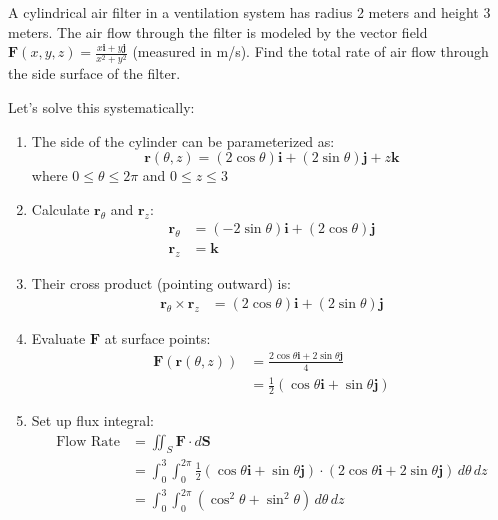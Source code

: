\exampleline
\begin{example}
A cylindrical air filter in a ventilation system has radius 2 meters and height 3 meters. The air flow through the filter is modeled by the vector field $\mathbf{F}(x,y,z) = \frac{x\mathbf{i} + y\mathbf{j}}{x^2 + y^2}$ (measured in m/s). Find the total rate of air flow through the side surface of the filter.

\begin{solution}
Let's solve this systematically:

\begin{enumerate}
    \item The side of the cylinder can be parameterized as:
    \[
    \mathbf{r}(\theta,z) = (2\cos\theta)\mathbf{i} + (2\sin\theta)\mathbf{j} + z\mathbf{k}
    \]
    where $0 \leq \theta \leq 2\pi$ and $0 \leq z \leq 3$
    
    \item Calculate $\mathbf{r}_\theta$ and $\mathbf{r}_z$:
    \begin{align*}
        \mathbf{r}_\theta &= (-2\sin\theta)\mathbf{i} + (2\cos\theta)\mathbf{j} \\
        \mathbf{r}_z &= \mathbf{k}
    \end{align*}
    
    \item Their cross product (pointing outward) is:
    \begin{align*}
        \mathbf{r}_\theta \times \mathbf{r}_z &= (2\cos\theta)\mathbf{i} + (2\sin\theta)\mathbf{j}
    \end{align*}
    
    \item Evaluate $\mathbf{F}$ at surface points:
    \begin{align*}
        \mathbf{F}(\mathbf{r}(\theta,z)) &= \frac{2\cos\theta\mathbf{i} + 2\sin\theta\mathbf{j}}{4} \\
        &= \frac{1}{2}(\cos\theta\mathbf{i} + \sin\theta\mathbf{j})
    \end{align*}
    
    \item Set up flux integral:
    \begin{align*}
        \text{Flow Rate} &= \iint_S \mathbf{F} \cdot d\mathbf{S} \\
        &= \int_0^3\int_0^{2\pi} \frac{1}{2}(\cos\theta\mathbf{i} + \sin\theta\mathbf{j}) \cdot (2\cos\theta\mathbf{i} + 2\sin\theta\mathbf{j})\,d\theta\,dz \\
        &= \int_0^3\int_0^{2\pi} (\cos^2\theta + \sin^2\theta)\,d\theta\,dz
    \end{align*}
    

\end{enumerate}
\end{solution}
\end{example}
